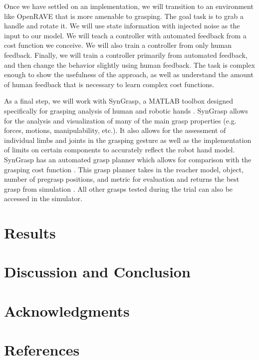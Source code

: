 \documentclass{article}
\begin{document}
	Once we have settled on an implementation, we will transition to an environment like OpenRAVE that is more amenable to grasping.  The goal task is to grab a handle and rotate it.  We will use state information with injected noise as the input to our model.  We will teach a controller with automated feedback from a cost function we conceive. We will also train a controller from only human feedback.  Finally, we will train a controller primarily from automated feedback, and then change the behavior slightly using human feedback.  The task is complex enough to show the usefulness of the approach, as well as understand the amount of human feedback that is necessary to learn complex cost functions.
	
	As a final step, we will work with SynGrasp, a MATLAB toolbox designed specifically for grasping analysis of human and robotic hands \cite{malvezzi2015syngrasp}. SynGrasp allows for the analysis and visualization of many of the main grasp properties (e.g. forces, motions, manipulability, etc.). It also allows for the assessment of individual limbs and joints in the grasping gesture as well as the implementation of limits on certain components to accurately reflect the robot hand model. SynGrasp has an automated grasp planner which allows for comparison with the grasping cost function \cite{malvezzi2013syngrasp}. This grasp planner takes in the reacher model, object, number of pregrasp positions, and metric for evaluation and returns the best grasp from simulation \cite{malvezzi2015syngrasp}. All other grasps tested during the trial can also be accessed in the simulator. 
	
\section{Results}






\section{Discussion and Conclusion}

\section{Acknowledgments}

\section{References}

\medskip
\small



\end{document}
